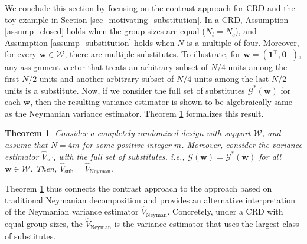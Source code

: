 \documentclass[12pt]{article}
\newtheorem{theorem}{Theorem}[section]
\begin{document}
We conclude this section by focusing on the contrast approach for CRD and the toy example in Section \ref{sec_motivating_substitution}.
In a CRD, Assumption \ref{assump_closed} holds when the group sizes are equal ($N_t = N_c$), and Assumption \ref{assump_substitution} holds when $N$ is a multiple of four. Moreover, for every $\bm{w} \in \mathcal{W}$, there are multiple substitutes. To illustrate, for $\bm{w} = (\bm{1}^\top,\bm{0}^\top)$, any assignment vector that treats an arbitrary subset of $N/4$ units among the first $N/2$ units and another arbitrary subset of $N/4$ units among the last $N/2$ units is a substitute. Now, if we consider the full set of substitutes $\mathcal{G}^*(\bm{w})$ for each $\bm{w}$, then the resulting variance estimator is shown to be algebraically same as the Neymanian variance estimator. Theorem \ref{thm_substitute_neyman} formalizes this result. 
\begin{theorem} \normalfont
Consider a completely randomized design with support $\mathcal{W}$, and assume that $N = 4m$ for some positive integer $m$. Moreover, consider the variance estimator $\hat{V}_{\text{sub}}$ with the full set of substitutes, i.e., $\mathcal{G}(\bm{w}) = \mathcal{G}^*(\bm{w})$ for all $\bm{w} \in \mathcal{W}$. Then, $\hat{V}_{\text{sub}} = \hat{V}_{\text{Neyman}}.$ \label{thm_substitute_neyman}
\end{theorem}
Theorem \ref{thm_substitute_neyman} thus connects the contrast approach to the approach based on traditional Neymanian decomposition and provides an alternative interpretation of the Neymanian variance estimator $\hat{V}_{\text{Neyman}}$. Concretely, under a CRD with equal group sizes, the $\hat{V}_{\text{Neyman}}$ is the variance estimator that uses the largest class of substitutes. 
\end{document}
